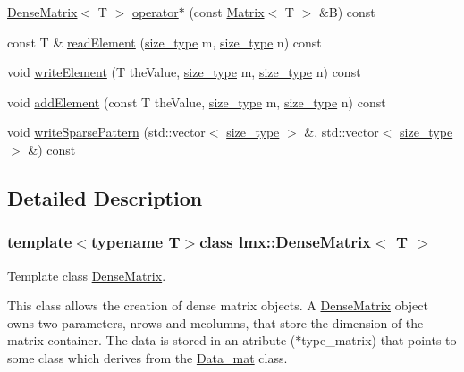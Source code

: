 \begin{DoxyCompactItemize}
\item 
\hyperlink{classlmx_1_1DenseMatrix}{Dense\-Matrix}$<$ T $>$ \hyperlink{classlmx_1_1DenseMatrix_a99abe2af4a4f29c52a1ac81b349f959f}{operator$\ast$} (const \hyperlink{classlmx_1_1Matrix}{Matrix}$<$ T $>$ \&B) const 
\item 
const T \& \hyperlink{classlmx_1_1DenseMatrix_a3e3551eb4f7f09d28e0966108a02276d}{read\-Element} (\hyperlink{lmx__mat__data_8h_a49b489a408a211a90e766329c0732d7b}{size\-\_\-type} m, \hyperlink{lmx__mat__data_8h_a49b489a408a211a90e766329c0732d7b}{size\-\_\-type} n) const 
\item 
void \hyperlink{classlmx_1_1DenseMatrix_a7c3702d29f2ceb974969eb9958e2ffcd}{write\-Element} (T the\-Value, \hyperlink{lmx__mat__data_8h_a49b489a408a211a90e766329c0732d7b}{size\-\_\-type} m, \hyperlink{lmx__mat__data_8h_a49b489a408a211a90e766329c0732d7b}{size\-\_\-type} n) const 
\item 
void \hyperlink{classlmx_1_1DenseMatrix_ac5eaf745aa3eee21569ce04284ed6449}{add\-Element} (const T the\-Value, \hyperlink{lmx__mat__data_8h_a49b489a408a211a90e766329c0732d7b}{size\-\_\-type} m, \hyperlink{lmx__mat__data_8h_a49b489a408a211a90e766329c0732d7b}{size\-\_\-type} n) const 
\item 
void \hyperlink{classlmx_1_1DenseMatrix_ad42b0105c37cdd71f696bf939b105c4c}{write\-Sparse\-Pattern} (std\-::vector$<$ \hyperlink{lmx__mat__data_8h_a49b489a408a211a90e766329c0732d7b}{size\-\_\-type} $>$ \&, std\-::vector$<$ \hyperlink{lmx__mat__data_8h_a49b489a408a211a90e766329c0732d7b}{size\-\_\-type} $>$ \&) const 
\end{DoxyCompactItemize}


\subsection{Detailed Description}
\subsubsection*{template$<$typename T$>$class lmx\-::\-Dense\-Matrix$<$ T $>$}

Template class \hyperlink{classlmx_1_1DenseMatrix}{Dense\-Matrix}. 

This class allows the creation of dense matrix objects. A \hyperlink{classlmx_1_1DenseMatrix}{Dense\-Matrix} object owns two parameters, nrows and mcolumns, that store the dimension of the matrix container. The data is stored in an atribute ($\ast$type\-\_\-matrix) that points to some class which derives from the \hyperlink{classlmx_1_1Data__mat}{Data\-\_\-mat} class.


